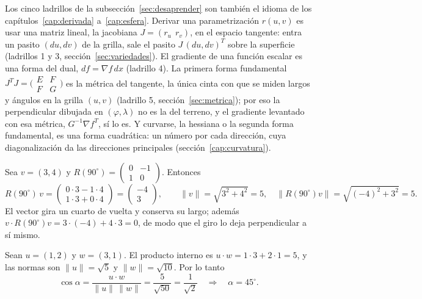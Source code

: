 \begin{resultado}
Los cinco ladrillos de la subsección~\ref{sec:desaprender} son también el idioma de los
capítulos~\ref{cap:derivada} a~\ref{cap:esfera}. Derivar una parametrización \(r(u,v)\) es usar una matriz lineal, la
jacobiana \(J=(r_u\ \ r_v)\), en el espacio tangente: entra un pasito \((du,dv)\) de la
grilla, sale el pasito \(J\,(du,dv)^T\) sobre la superficie (ladrillos 1 y 3,
sección~\ref{sec:variedades}). El gradiente de una función escalar es una forma del dual,
\(df=\nabla f\,dx\) (ladrillo 4). La primera forma fundamental \(J^TJ=
\bigl(\begin{smallmatrix}E&F\\ F&G\end{smallmatrix}\bigr)\) es la métrica del tangente,
la única cinta con que se miden largos y ángulos en la grilla \((u,v)\) (ladrillo 5,
sección~\ref{sec:metrica}); por eso la perpendicular dibujada en \((\varphi,\lambda)\) no
es la del terreno, y el gradiente levantado con esa métrica, \(G^{-1}\nabla f^{T}\), sí lo
es. Y curvarse, la hessiana o la segunda forma fundamental, es una forma cuadrática: un
número por cada dirección, cuya diagonalización da las direcciones principales
(sección~\ref{cap:curvatura}).
\end{resultado}
\begin{ejemplo}
Sea \(v=(3,4)\) y \(R(90^\circ)=\left(\begin{smallmatrix}0&-1\\1&0\end{smallmatrix}\right)\). Entonces
\[
R(90^\circ)\,v=\begin{pmatrix}0\cdot3-1\cdot4\\ 1\cdot3+0\cdot4\end{pmatrix}=\begin{pmatrix}-4\\3\end{pmatrix},
\qquad
\lVert v\rVert=\sqrt{3^2+4^2}=5,\quad \lVert R(90^\circ)v\rVert=\sqrt{(-4)^2+3^2}=5.
\]
El vector gira un cuarto de vuelta y conserva su largo; además \(v\cdot R(90^\circ)v=3\cdot(-4)+4\cdot3=0\), de modo que
el giro lo deja perpendicular a sí mismo.
\end{ejemplo}

\begin{ejemplo}
Sean \(u=(1,2)\) y \(w=(3,1)\). El producto interno es \(u\cdot w=1\cdot3+2\cdot1=5\), y las normas son
\(\lVert u\rVert=\sqrt5\) y \(\lVert w\rVert=\sqrt{10}\). Por lo tanto
\[
\cos\alpha=\frac{u\cdot w}{\lVert u\rVert\,\lVert w\rVert}=\frac{5}{\sqrt{50}}=\frac{1}{\sqrt2}
\quad\Longrightarrow\quad \alpha=45^\circ.
\]
\end{ejemplo}

